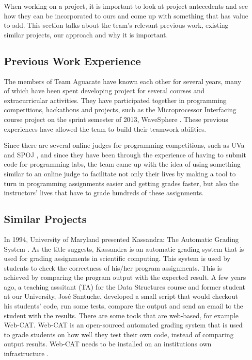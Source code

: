 When working on a project, it is important to look at project antecedents and
see how they can be incorporated to ours and come up with something that has
value to add. This section talks about the team's relevant previous work,
existing similar projects, our approach and why it is important.

\subsection{Previous Work Experience}

The members of Team Aguacate have known each other for several years, many of
which have been spent developing project for several courses and extracurricular
activities. They have participated together in programming competitions,
hackathons and projects, such as the Microprocessor Interfacing course project
on the sprint semester of 2013, WaveSphere \cite{Micro2}. These previous
experiences have allowed the team to build their teamwork abilities.

Since there are several online judges for programming competitions, such as UVa
\cite{UVA} and SPOJ \cite{SPOJ}, and since they have been through the experience
of having to submit code for programming labs, the team came up with the idea of
using something similar to an online judge to facilitate not only their lives by
making a tool to turn in programming assignments easier and getting grades
faster, but also the instructors' lives that have to grade hundreds of these
assignments.

\subsection{Similar Projects}

In 1994, University of Maryland presented Kassandra: The Automatic Grading
System \cite{Matt1994}. As the title suggests, Kassandra is an automatic grading
system that is used for grading assignments in scientific computing. This system
is used by students to check the correctness of his/her program assignments.
This is achieved by comparing the program output with the expected result. A few
years ago, a teaching asssitant (TA) for the Data Structures course and former
student at our University, José Santuche, developed a small script that would
checkout his students' code, run some tests, compare the output and send an
email to the student with the results. There are some tools that are web-based,
for example Web-CAT. Web-CAT is an open-sourced automated grading system that is
used to grade students on how well they test their own code, instead of
comparing output results. Web-CAT needs to be installed on an institutions own
infrastructure \cite{WebCat}.

